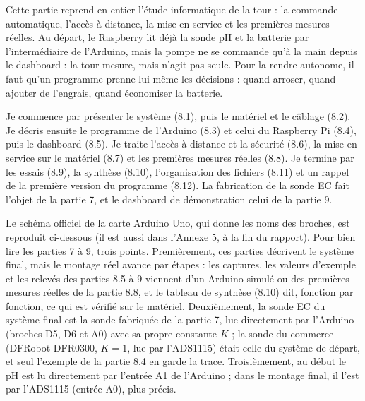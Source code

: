 \clearpage
{}

Cette partie reprend en entier l'étude informatique de la tour : la commande automatique, l'accès à distance, la mise en service et les premières mesures réelles. Au départ, le Raspberry lit déjà la sonde pH et la batterie par l'intermédiaire de l'Arduino, mais la pompe ne se commande qu'à la main depuis le dashboard : la tour mesure, mais n'agit pas seule. Pour la rendre autonome, il faut qu'un programme prenne lui-même les décisions : quand arroser, quand ajouter de l'engrais, quand économiser la batterie.

Je commence par présenter le système (8.1), puis le matériel et le câblage (8.2). Je décris ensuite le programme de l'Arduino (8.3) et celui du Raspberry Pi (8.4), puis le dashboard (8.5). Je traite l'accès à distance et la sécurité (8.6), la mise en service sur le matériel (8.7) et les premières mesures réelles (8.8). Je termine par les essais (8.9), la synthèse (8.10), l'organisation des fichiers (8.11) et un rappel de la première version du programme (8.12). La fabrication de la sonde EC fait l'objet de la partie 7, et le dashboard de démonstration celui de la partie 9.

\begin{attention}
Le schéma officiel de la carte Arduino Uno, qui donne les noms des broches, est reproduit ci-dessous (il est aussi dans l'Annexe 5, à la fin du rapport). Pour bien lire les parties 7 à 9, trois points. Premièrement, ces parties décrivent le système final, mais le montage réel avance par étapes : les captures, les valeurs d'exemple et les relevés des parties 8.5 à 9 viennent d'un Arduino simulé ou des premières mesures réelles de la partie 8.8, et le tableau de synthèse (8.10) dit, fonction par fonction, ce qui est vérifié sur le matériel. Deuxièmement, la sonde EC du système final est la sonde fabriquée de la partie 7, lue directement par l'Arduino (broches D5, D6 et A0) avec sa propre constante $K$ ; la sonde du commerce (DFRobot DFR0300, $K = 1$, lue par l'ADS1115) était celle du système de départ, et seul l'exemple de la partie 8.4 en garde la trace. Troisièmement, au début le pH est lu directement par l'entrée A1 de l'Arduino ; dans le montage final, il l'est par l'ADS1115 (entrée A0), plus précis.
\end{attention}

